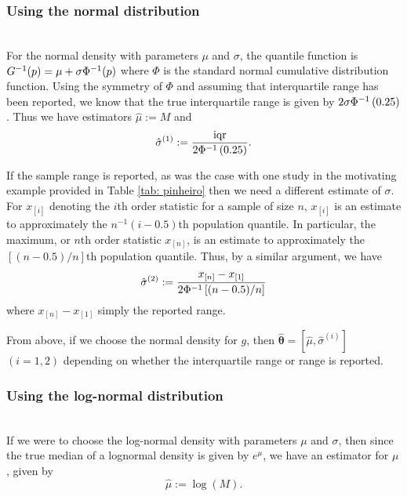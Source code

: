 \documentclass{article}
\begin{document}
\subsubsection{Using the normal distribution}\label{sect:using_norm}~\\

\noindent For the normal density with parameters $\mu$ and $\sigma$, the quantile function is $G^{-1}(p) = \mu + \sigma \Phi^{-1}(p)$ where $\Phi$ is the standard normal cumulative distribution function. Using the symmetry of $\Phi$ and assuming that interquartile range has been reported, we know that the true interquartile range is given by $2\sigma\Phi^{-1}\left(0.25 \right)$. Thus we have estimators $\hat\mu := M$ and \begin{equation*}
\hat{\sigma}^{(1)} := \frac {\operatorname{iqr}} {2 \Phi^{-1} \left ( 0.25 \right)}.
\end{equation*}

If the sample range is reported, as was the case with one study in the motivating example provided in Table \ref{tab: pinheiro} then we need a different estimate of $\sigma$. For $x_{[i]}$ denoting the $i$th order statistic for a sample of size $n$, $x_{[i]}$ is an estimate to approximately the $n^{-1}(i - 0.5)$th population quantile. In particular, the maximum, or $n$th order statistic $x_{[n]}$, is an estimate to approximately the $[(n - 0.5)/n]$th population quantile. Thus, by a similar argument, we have
\begin{equation*}
\hat{\sigma}^{(2)} := \frac {x_{[n]} - x_{[1]}} {2 \Phi^{-1} \left [ (n-0.5)/n \right]}
\end{equation*}
where $x_{[n]} - x_{[1]}$ simply the reported range.

From above, if we choose the normal density for $g$, then $\hat{\bm{\theta}}=[\hat \mu, \hat{\sigma}^{(i)}]$ $(i=1,2)$ depending on whether the interquartile range or range is reported.

\subsubsection{Using the log-normal distribution}~\\

\noindent If we were to choose the log-normal density with parameters $\mu$ and $\sigma$, then since the true median of a lognormal density is given by $e^\mu$, we have an estimator for $\mu$, given by
\begin{equation*}\label{mu-hat}
\hat \mu := \log(M).
\end{equation*}
\end{document}
